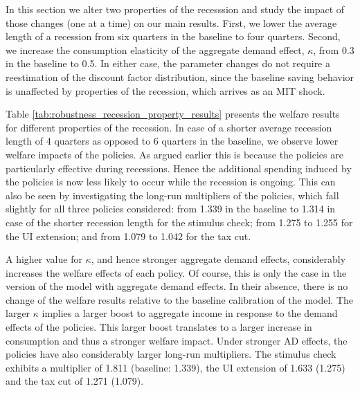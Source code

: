 \documentclass[../HAFiscal]{subfiles}
\begin{document}
In this section we alter two properties of the recesssion and study the impact of those changes (one at a time) on our main results. First, we lower the average length of a recession from six quarters in the baseline to four quarters. Second, we increase the consumption elasticity of the aggregate demand effect, $\kappa$, from 0.3 in the baseline to 0.5. In either case, the parameter changes do not require a reestimation of the discount factor distribution, since the baseline saving behavior is unaffected by properties of the recession, which arrives as an MIT shock. 

Table \ref{tab:robustness_recession_property_results} presents the welfare results for different properties of the recession. In case of a shorter average recession length of 4 quarters as opposed to 6 quarters in the baseline, we observe lower welfare impacts of the policies. As argued earlier this is because the policies are particularly effective during recessions. Hence the additional spending induced by the policies is now less likely to occur while the recession is ongoing. This can also be seen by investigating the long-run multipliers of the policies, which fall slightly for all three policies considered: from 1.339 in the baseline to 1.314 in case of the shorter recession length for the stimulus check; from 1.275 to 1.255 for the UI extension; and from 1.079 to 1.042 for the tax cut.

A higher value for $\kappa$, and hence stronger aggregate demand effects, considerably increases the welfare effects of each policy. Of course, this is only the case in the version of the model with aggregate demand effects. In their absence, there is no change of the welfare results relative to the baseline calibration of the model. The larger $\kappa$ implies a larger boost to aggregate income in response to the demand effects of the policies. This larger boost translates to a larger increase in consumption and thus a stronger welfare impact. Under stronger AD effects, the policies have also considerably larger long-run multipliers. The stimulus check exhibits a multiplier of 1.811 (baseline: 1.339), the UI extension of 1.633 (1.275) and the tax cut of 1.271 (1.079).
\end{document}
